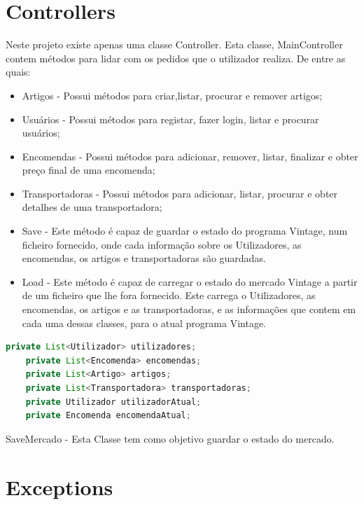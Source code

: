 \documentclass[a4paper]{report}
\begin{document}
    \section{Controllers}

    \par
    Neste projeto existe apenas uma classe Controller. Esta classe, MainController contem métodos para lidar com os pedidos que o utilizador realiza. De entre as quais:

    \begin{itemize}
        \item Artigos - Possui métodos para criar,listar, procurar e remover artigos;
        \item Usuários - Possui métodos para registar, fazer login, listar e procurar usuários;
        \item Encomendas - Possui métodos para adicionar, remover, listar, finalizar e obter preço final de uma encomenda;
        \item Transportadoras - Possui métodos para adicionar, listar, procurar e obter detalhes de uma transportadora;
        \item Save - Este método é capaz de guardar o estado do programa Vintage, num ficheiro fornecido, onde cada informação sobre os Utilizadores, as encomendas, os artigos e transportadoras são guardadas.
        \item Load - Este método é capaz de carregar o estado do mercado Vintage a partir de um ficheiro que lhe fora fornecido. Este carrega o Utilizadores, as encomendas, os artigos e as transportadoras, e as informações que contem em cada uma dessas classes, para o atual programa Vintage.
    \end{itemize}
    
    \begin{lstlisting}[language=java]
    private List<Utilizador> utilizadores;
    private List<Encomenda> encomendas;
    private List<Artigo> artigos;
    private List<Transportadora> transportadoras;
    private Utilizador utilizadorAtual;
    private Encomenda encomendaAtual;

    \end{lstlisting}
    
    \par SaveMercado - Esta Classe tem como objetivo guardar o estado do mercado.
    
    \section{Exceptions}
    
\end{document}
